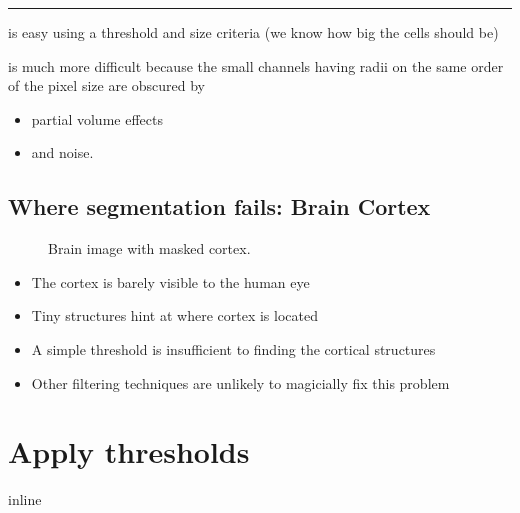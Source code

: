 \documentclass[letterpaper,10pt,english]{sphinxmanual}
\begin{document}
\bigskip\hrule\bigskip


\sphinxAtStartPar
{}
is easy using a threshold and size criteria (we know how big the cells should be)

\sphinxAtStartPar
{}
is much more difficult because the small channels having radii on the same order of the pixel size are obscured by
\begin{itemize}
\item {} 
\sphinxAtStartPar
partial volume effects

\item {} 
\sphinxAtStartPar
and noise.

\end{itemize}


\section{Where segmentation fails: Brain Cortex}
\label{\detokenize{05-AdvancedSegmentation:where-segmentation-fails-brain-cortex}}
\begin{figure}[htbp]
\centering
\capstart

\noindent{}
\caption{Brain image with masked cortex.}\label{\detokenize{05-AdvancedSegmentation:id3}}\end{figure}


\begin{itemize}
\item {} 
\sphinxAtStartPar
The cortex is barely visible to the human eye

\item {} 
\sphinxAtStartPar
Tiny structures hint at where cortex is located

\end{itemize}

\sphinxAtStartPar
{}
\begin{itemize}
\item {} 
\sphinxAtStartPar
A simple threshold is insufficient to finding the cortical structures

\item {} 
\sphinxAtStartPar
Other filtering techniques are unlikely to magicially fix this problem

\end{itemize}


\chapter{Apply thresholds}
\label{\detokenize{05-AdvancedSegmentation:apply-thresholds}}
\begin{sphinxVerbatim}[commandchars=\\\{\}]
 inline
   
   
   
\end{sphinxVerbatim}
\end{document}

